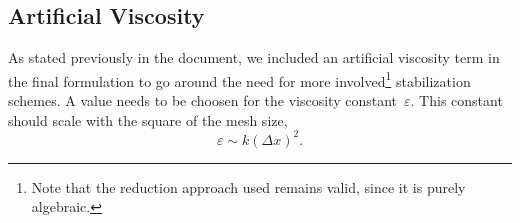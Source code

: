 \documentclass[../../thesis.tex]{subfiles}
\begin{document}
\subsection{Artificial Viscosity}
\label{sec:fom_calibration_artificial_viscosity}
As stated previously in the document, 
we included an artificial viscosity term in the final formulation
to go around the need for more involved\footnote{
    Note that the reduction approach used remains valid,
    since it is purely algebraic.} 
stabilization schemes.
A value needs to be choosen for the viscosity constant~$\varepsilon$.
This constant should scale with the square of the mesh size, 
\begin{equation*}
    \varepsilon \sim k (\Delta x)^2.
\end{equation*}
\end{document}
